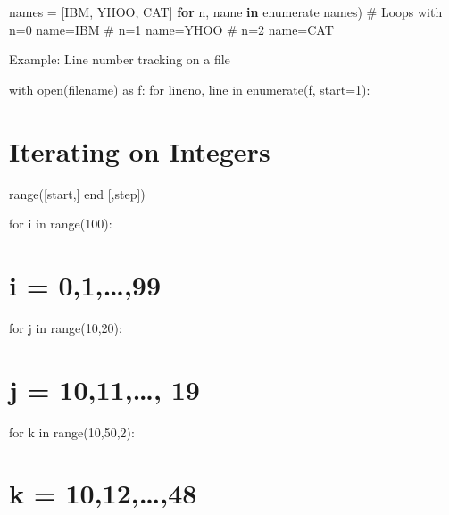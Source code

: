 \documentclass[
  letterpaper,
  DIV=11,
  numbers=noendperiod]{scrreprt}
\newenvironment{Shaded}{\begin{snugshade}}{\end{snugshade}}
\newcommand{\BuiltInTok}[1]{\textcolor[rgb]{0.00,0.23,0.31}{#1}}
\newcommand{\CommentTok}[1]{\textcolor[rgb]{0.37,0.37,0.37}{#1}}
\newcommand{\ControlFlowTok}[1]{\textcolor[rgb]{0.00,0.23,0.31}{\textbf{#1}}}
\newcommand{\KeywordTok}[1]{\textcolor[rgb]{0.00,0.23,0.31}{\textbf{#1}}}
\newcommand{\NormalTok}[1]{\textcolor[rgb]{0.00,0.23,0.31}{#1}}
\newcommand{\OperatorTok}[1]{\textcolor[rgb]{0.37,0.37,0.37}{#1}}
\newcommand{\StringTok}[1]{\textcolor[rgb]{0.13,0.47,0.30}{#1}}
\begin{document}
\begin{Shaded}
\begin{Highlighting}[]
\NormalTok{names }\OperatorTok{=}\NormalTok{ [}\StringTok{\textquotesingle{}IBM\textquotesingle{}}\NormalTok{, }\StringTok{\textquotesingle{}YHOO\textquotesingle{}}\NormalTok{, }\StringTok{\textquotesingle{}CAT\textquotesingle{}}\NormalTok{]  }
\ControlFlowTok{for}\NormalTok{ n, name }\KeywordTok{in} \BuiltInTok{enumerate}\NormalTok{ names)  }
    \CommentTok{\# Loops with n=0 name=\textquotesingle{}IBM\textquotesingle{}  }
    \CommentTok{\# n=1 name=\textquotesingle{}YHOO\textquotesingle{}  }
    \CommentTok{\# n=2 name=\textquotesingle{}CAT\textquotesingle{} }
\end{Highlighting}
\end{Shaded}

Example: Line number tracking on a file

\begin{Shaded}
\begin{Highlighting}[]
\NormalTok{with open(filename) as f: for lineno, line in enumerate(f, start=1): }
\end{Highlighting}
\end{Shaded}


\chapter{Iterating on Integers}\label{iterating-on-integers}

range({[}start,{]} end {[},step{]})

for i in range(100):


\chapter{i = 0,1,\ldots,99}\label{i-0199}

for j in range(10,20):


\chapter{j = 10,11,\ldots, 19}\label{j-1011-19}

for k in range(10,50,2):


\chapter{k = 10,12,\ldots,48}\label{k-101248}
\end{document}
